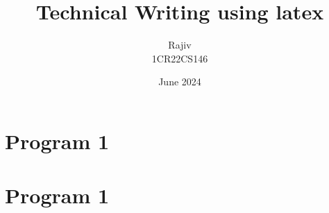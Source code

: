 \documentclass{article}
\title{Technical Writing using latex}
\author{Rajiv \\1CR22CS146}
\date{June 2024}
\begin{document}
\maketitle
\section{Program 1}
\lipsum[1]
\section{Program 1}
\lipsum[1]
\end{document}
